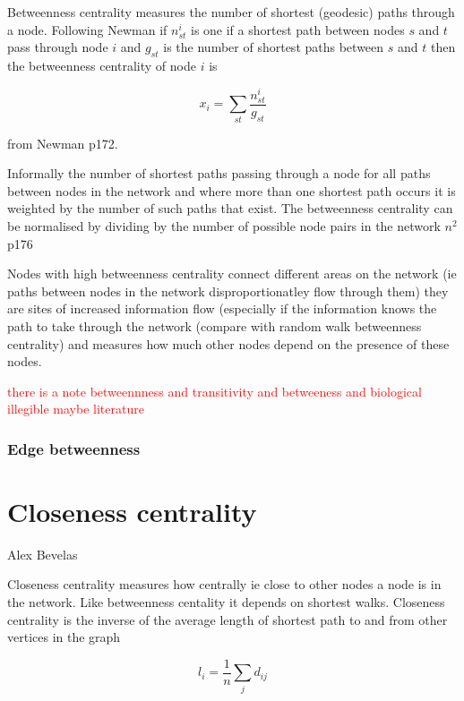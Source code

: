 Betweenness centrality measures the number of shortest (geodesic) paths through a node. Following Newman if $n_{st}^i$ is one if a shortest path between nodes $s$ and $t$ pass through node $i$ and $g_{st}$ is the number of shortest paths between $s$ and $t$ then the betweenness centrality of node $i$ is

\begin{equation}
    x_i = \sum_{st} \frac{n_{st}^i}{g_{st}}
\end{equation}
\label{eq: Betweenness centrality}

from Newman \cite{newman2018networks} p172. 

Informally the number of shortest paths passing through a node for all paths between nodes in the network and where more than one shortest path occurs it is weighted by the number of such paths that exist. The betweenness centrality can be normalised by dividing by the number of possible node pairs in the network $n^2$ \cite{newman2018networks} p176

Nodes with high betweenness centrality connect different areas on the network (ie paths between nodes in the network disproportionatley flow through them) they are sites of increased information flow (especially if the information knows the path to take through the network (compare with random walk betweenness centrality) and measures how much other nodes depend on the presence of these nodes.


\textcolor{red}{there is a note betweennness and transitivity and betweeness and biological illegible maybe literature}
 
\subsubsection{Edge betweenness}


\section{Closeness centrality}
\label{sec:closenesscentrality}
Alex Bevelas

Closeness centrality measures how centrally ie close to other nodes a node is in the network. Like betweenness centality it depends on shortest walks. Closeness centrality is the inverse of the  average length of shortest path to and from other vertices in the graph \cite{freeman1978centrality}

\begin{equation}
    l_i = \frac{1}{n} \sum_j d_{ij}
\end{equation}

